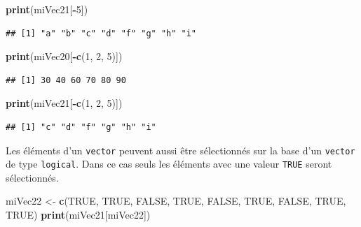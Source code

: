 \documentclass[
]{book}
\newenvironment{Shaded}{\begin{snugshade}}{\end{snugshade}}
\newcommand{\DecValTok}[1]{\textcolor[rgb]{0.00,0.00,0.81}{#1}}
\newcommand{\KeywordTok}[1]{\textcolor[rgb]{0.13,0.29,0.53}{\textbf{#1}}}
\newcommand{\NormalTok}[1]{#1}
\newcommand{\OperatorTok}[1]{\textcolor[rgb]{0.81,0.36,0.00}{\textbf{#1}}}
\newcommand{\OtherTok}[1]{\textcolor[rgb]{0.56,0.35,0.01}{#1}}
\newcommand{\StringTok}[1]{\textcolor[rgb]{0.31,0.60,0.02}{#1}}
\begin{document}
\begin{Shaded}
\begin{Highlighting}[]
\KeywordTok{print}\NormalTok{(miVec21[}\OperatorTok{-}\DecValTok{5}\NormalTok{])}
\end{Highlighting}
\end{Shaded}

\begin{verbatim}
## [1] "a" "b" "c" "d" "f" "g" "h" "i"
\end{verbatim}

\begin{Shaded}
\begin{Highlighting}[]
\KeywordTok{print}\NormalTok{(miVec20[}\OperatorTok{-}\KeywordTok{c}\NormalTok{(}\DecValTok{1}\NormalTok{, }\DecValTok{2}\NormalTok{, }\DecValTok{5}\NormalTok{)])}
\end{Highlighting}
\end{Shaded}

\begin{verbatim}
## [1] 30 40 60 70 80 90
\end{verbatim}

\begin{Shaded}
\begin{Highlighting}[]
\KeywordTok{print}\NormalTok{(miVec21[}\OperatorTok{-}\KeywordTok{c}\NormalTok{(}\DecValTok{1}\NormalTok{, }\DecValTok{2}\NormalTok{, }\DecValTok{5}\NormalTok{)])}
\end{Highlighting}
\end{Shaded}

\begin{verbatim}
## [1] "c" "d" "f" "g" "h" "i"
\end{verbatim}

Les éléments d'un \texttt{vector} peuvent aussi être sélectionnés sur la base d'un \texttt{vector} de type \texttt{logical}. Dans ce cas seuls les éléments avec une valeur \texttt{TRUE} seront sélectionnés.

\begin{Shaded}
\begin{Highlighting}[]
\NormalTok{miVec22 <-}\StringTok{ }\KeywordTok{c}\NormalTok{(}\OtherTok{TRUE}\NormalTok{, }\OtherTok{TRUE}\NormalTok{, }\OtherTok{FALSE}\NormalTok{, }\OtherTok{TRUE}\NormalTok{, }\OtherTok{FALSE}\NormalTok{, }\OtherTok{TRUE}\NormalTok{, }\OtherTok{FALSE}\NormalTok{, }\OtherTok{TRUE}\NormalTok{, }\OtherTok{TRUE}\NormalTok{)}
\KeywordTok{print}\NormalTok{(miVec21[miVec22])}
\end{Highlighting}
\end{Shaded}
\end{document}
